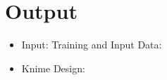 \documentclass[10pt,a4paper]{article}
\begin{document}
\section{Output}
\begin{itemize} 	
\item Input:
Training and Input Data:
 \begin{center}
	\begin{figure}[!htbp]
		\centering
	\end{figure}
\end{center} 

\begin{center}
	\begin{figure}[!htbp]
		\centering
	\end{figure}
\end{center} 

\newpage
\item Knime Design:


\end{itemize}
\end{document}
